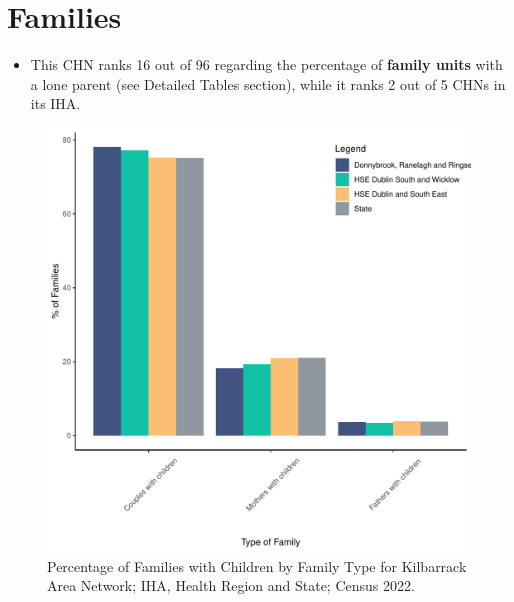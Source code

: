 \documentclass{article}
\begin{document}
\section{Families}\label{sect:Fam}
\begin{itemize}
\item This CHN ranks  16 out of 96 regarding the percentage of \textbf{family units} with a lone parent (see Detailed Tables section), while it ranks   2 out of 5 CHNs in its IHA.
\end{itemize}
\begin{figure}[H]
	\centering
	\includegraphics[width = 150mm]{../figures/FamED.pdf}
	\caption{Percentage of Families with Children by Family Type for Kilbarrack Area Network; IHA, Health Region and State; Census 2022.}
	\label{fig:vbnv}
	\end{figure}
	
\end{document}
